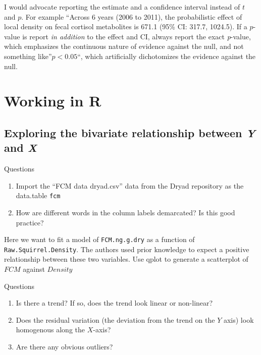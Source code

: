 \documentclass[]{book}
\providecommand{\tightlist}{%
  \setlength{\itemsep}{0pt}\setlength{\parskip}{0pt}}
\begin{document}
I would advocate reporting the estimate and a confidence interval
instead of \(t\) and \(p\). For example ``Across 6 years (2006 to 2011),
the probabilistic effect of local density on fecal cortisol metabolites
is 671.1 (95\% CI: 317.7, 1024.5). If a \(p\)-value is report \emph{in
addition} to the effect and CI, always report the exact \emph{p}-value,
which emphasizes the continuous nature of evidence against the null, and
not something like''\(p < 0.05\)``, which artificially dichotomizes the
evidence against the null.

\section{Working in R}\label{working-in-r-1}

\subsection{\texorpdfstring{Exploring the bivariate relationship between
\emph{Y} and
\emph{X}}{Exploring the bivariate relationship between Y and X}}\label{exploring-the-bivariate-relationship-between-y-and-x}

Questions

\begin{enumerate}
\def\labelenumi{\arabic{enumi}.}
\tightlist
\item
  Import the ``FCM data dryad.csv'' data from the Dryad repository as
  the data.table \texttt{fcm}
\item
  How are different words in the column labels demarcated? Is this good
  practice?
\end{enumerate}

Here we want to fit a model of \texttt{FCM.ng.g.dry} as a function of
\texttt{Raw.Squirrel.Density}. The authors used prior knowledge to
expect a positive relationship between these two variables. Use qplot to
generate a scatterplot of \(FCM\) against \(Density\)

Questions

\begin{enumerate}
\def\labelenumi{\arabic{enumi}.}
\setcounter{enumi}{2}
\tightlist
\item
  Is there a trend? If so, does the trend look linear or non-linear?
\item
  Does the residual variation (the deviation from the trend on the \(Y\)
  axis) look homogenous along the \(X\)-axis?
\item
  Are there any obvious outliers?
\end{enumerate}
\end{document}

